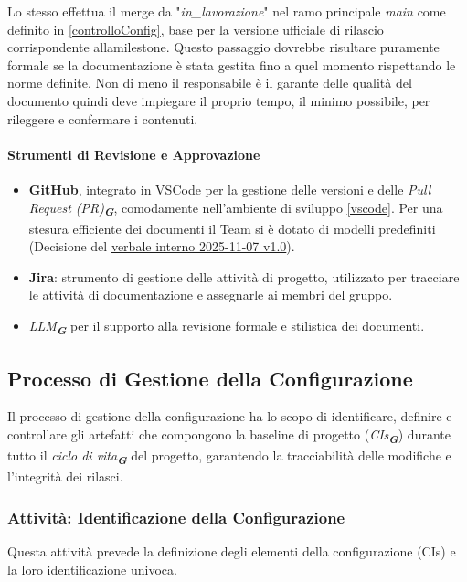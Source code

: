 \documentclass[a4paper,12pt]{article}
\newcommand{\glossario}[1]{\textit{#1}\textsubscript{\textbf{\textit{\textcolor{lightblack}{G}}}}}
\begin{document}
Lo stesso effettua il merge da "\textit{in\_lavorazione}" nel ramo
principale \textit{main} come definito in \ref{controlloConfig}, base per
la versione ufficiale di rilascio corrispondente allamilestone.
Questo passaggio dovrebbe risultare puramente formale se la documentazione
è stata gestita fino a quel momento rispettando le norme definite.
Non di meno il responsabile è il garante delle qualità del documento quindi deve impiegare il
proprio tempo, il minimo possibile, per rileggere e confermare i contenuti.

\paragraph{Strumenti di Revisione e Approvazione}
\begin{itemize}
    \item \textbf{GitHub}, integrato in VSCode per la gestione delle versioni e delle \glossario{\textit{Pull Request (PR)}}, comodamente nell'ambiente di sviluppo \ref{vscode}.
          Per una stesura efficiente dei documenti il Team si è dotato di modelli predefiniti (Decisione del \href{https://7-zpus.github.io/Docs/assets/pdf/Verbali/Verbali\%20Interni/2025-11-07-VerbaleInterno.pdf}{verbale interno 2025-11-07 v1.0}).
    \item \textbf{Jira}: strumento di gestione delle attività di progetto, utilizzato per tracciare le attività di documentazione e assegnarle ai membri del gruppo.
    \item \glossario{LLM} per il supporto alla revisione formale e stilistica dei documenti.
\end{itemize}

\subsection{Processo di Gestione della Configurazione} \label{configurazione}
Il processo di gestione della configurazione ha lo scopo di identificare,
definire e controllare gli artefatti che compongono la baseline di progetto
(\glossario{CIs}) durante tutto il \glossario{ciclo di vita} del progetto, garantendo la
tracciabilità delle modifiche e l'integrità dei rilasci.

\subsubsection{Attività: Identificazione della Configurazione} 
Questa attività prevede la definizione degli elementi della configurazione
(CIs) e la loro identificazione univoca.
\end{document}
